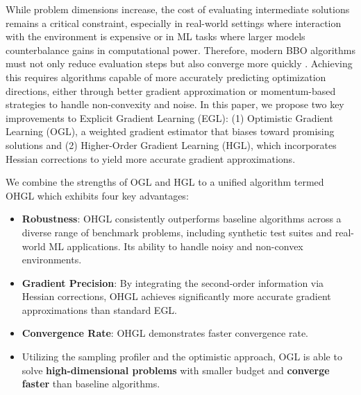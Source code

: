 While problem dimensions increase, the cost of evaluating intermediate solutions remains a critical constraint, especially in real-world settings where interaction with the environment is expensive or in ML tasks where larger models counterbalance gains in computational power. Therefore, modern BBO algorithms must not only reduce evaluation steps but also converge more quickly \cite{hansen2010comparing}. Achieving this requires algorithms capable of more accurately predicting optimization directions, either through better gradient approximation \cite{anil2020scalable,lesage2020second} or momentum-based strategies to handle non-convexity and noise. In this paper, we propose two key improvements to Explicit Gradient Learning (EGL): (1) Optimistic Gradient Learning (OGL), a weighted gradient estimator that biases toward promising solutions and (2) Higher-Order Gradient Learning (HGL), which incorporates Hessian corrections to yield more accurate gradient approximations.


We combine the strengths of OGL and HGL to a unified algorithm termed OHGL which exhibits four key advantages:

\begin{itemize}
    \item \textbf{Robustness}: OHGL consistently outperforms baseline algorithms across a diverse range of benchmark problems, including synthetic test suites and real-world ML applications. Its ability to handle noisy and non-convex environments.
    \item \textbf{Gradient Precision}: By integrating the second-order information via Hessian corrections, OHGL achieves significantly more accurate gradient approximations than standard EGL.
    \item \textbf{Convergence Rate}: OHGL demonstrates faster convergence rate.
    \item Utilizing the sampling profiler and the optimistic approach, OGL is able to solve \textbf{high-dimensional problems} with smaller budget and \textbf{converge faster} than baseline algorithms. 
\end{itemize}


